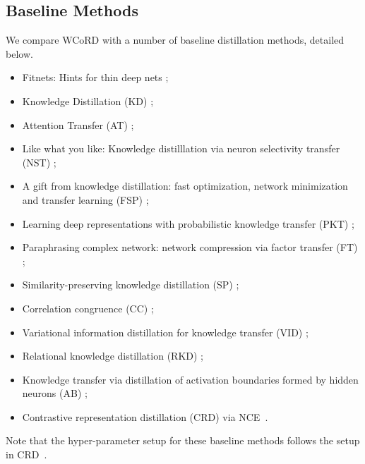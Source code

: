 \documentclass[final]{cvpr}
\theoremstyle{definition}
\begin{document}
\subsection{Baseline Methods}
We compare WCoRD with a number of baseline distillation methods, detailed below.
\begin{itemize}
	\item Fitnets: Hints for thin deep nets \cite{romero2014fitnets};
	\item Knowledge Distillation (KD) \cite{hinton2015distilling};
	\item Attention Transfer (AT) \cite{zagoruyko2016paying};
	\item Like what you like: Knowledge distilllation via neuron selectivity transfer (NST) \cite{huang2017like};
	\item A gift from knowledge distillation: fast optimization, network minimization and transfer learning (FSP) \cite{yim2017gift};
	\item Learning deep representations with probabilistic knowledge transfer (PKT) \cite{passalis2018learning};
	\item Paraphrasing complex network: network compression via factor transfer (FT) \cite{kim2018paraphrasing};
	\item Similarity-preserving knowledge distillation (SP) \cite{tung2019similarity};
	\item Correlation congruence (CC) \cite{peng2019correlation};
	\item Variational information distillation for knowledge transfer (VID) \cite{ahn2019variational};
	\item Relational knowledge distillation (RKD) \cite{park2019relational};
	\item Knowledge transfer via distillation of activation boundaries formed by hidden neurons (AB) \cite{heo2019knowledge};
	\item Contrastive representation distillation (CRD) \cite{tian2019contrastive} via NCE~\cite{gutmann2010noise}.
\end{itemize}
Note that the hyper-parameter setup for these baseline methods follows the setup in CRD~\cite{tian2019contrastive}.
\end{document}
